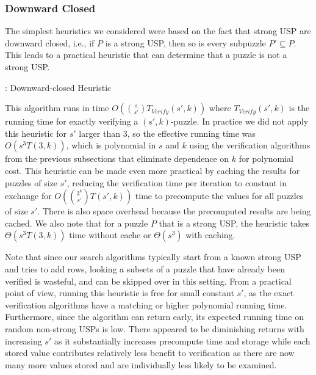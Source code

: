 \documentclass[11pt]{article}
\newcommand\sse{\subseteq}
\begin{document}
\subsubsection{Downward Closed}

The simplest heuristics we considered were based on the fact that
strong USP are downward closed, i.e., if $P$ is a strong USP, then
so is every subpuzzle $P' \sse P$.  This leads to a practical heuristic
that can determine that a puzzle is not a strong USP.

\begin{algorithm}[t]
  \caption{: Downward-closed Heuristic}
  \label{alg:downward-closed}
\begin{algorithmic}[1]
  \For{$P' \sse P, |P'| = s'$}
        \EndIf
  \EndFor{}
  \EndFunction
\end{algorithmic}
\end{algorithm}

This algorithm runs in time $O(\binom{s}{s'} T_{Verify}(s', k))$ where
$T_{Verify}(s',k)$ is the running time for exactly verifying a
$(s',k)$-puzzle.  In practice we did not apply this heuristic for $s'$
larger than $3$, so the effective running time was $O(s^3 T(3,k))$,
which is polynomial in $s$ and $k$ using the verification algorithms
from the previous subsections that eliminate dependence on $k$ for
polynomial cost.  This heuristic can be made even more practical by
caching the results for puzzles of size $s'$, reducing the
verification time per iteration to constant in exchange for
$O(\binom{3^k}{s'}T(s',k))$ time to precompute the values for all
puzzles of size $s'$.  There is also space overhead because the
precomputed results are being cached.  We also note that for a puzzle
$P$ that is a strong USP, the heuristic takes $\Theta(s^3 T(3,k))$
time without cache or $\Theta(s^3)$ with caching.

Note that since our search algorithms typically start from a known
strong USP and tries to add rows, looking a subsets of a puzzle that
have already been verified is wasteful, and can be skipped over in
this setting.  From a practical point of view, running this heuristic
is free for small constant $s'$, as the exact verification algorithms
have a matching or higher polynomial running time.  Furthermore, since
the algorithm can return early, its expected running time on random
non-strong USPs is low.  There appeared to be diminishing returns with
increasing $s'$ as it substantially increases precompute time and
storage while each stored value contributes relatively less benefit to
verification as there are now many more values stored and are
individually less likely to be examined.
\end{document}
